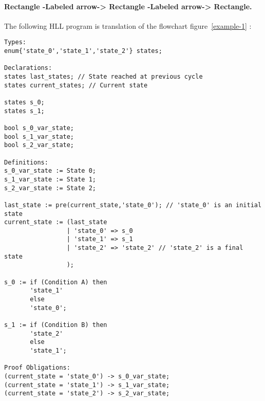 \paragraph{Rectangle -Labeled arrow-> Rectangle -Labeled arrow-> Rectangle.}
The following HLL program is translation of the flowchart
figure~\ref{example-1} : 
{\footnotesize
\begin{verbatim}
Types:
enum{'state_0','state_1','state_2'} states;

Declarations:
states last_states; // State reached at previous cycle
states current_states; // Current state

states s_0;
states s_1;

bool s_0_var_state;
bool s_1_var_state;
bool s_2_var_state;

Definitions:
s_0_var_state := State 0;
s_1_var_state := State 1;
s_2_var_state := State 2;

last_state := pre(current_state,'state_0'); // 'state_0' is an initial state
current_state := (last_state
                 | 'state_0' => s_0
                 | 'state_1' => s_1
                 | 'state_2' => 'state_2' // 'state_2' is a final state
                 );

s_0 := if (Condition A) then
       'state_1'
       else
       'state_0';

s_1 := if (Condition B) then
       'state_2'
       else
       'state_1';

Proof Obligations:
(current_state = 'state_0') -> s_0_var_state;
(current_state = 'state_1') -> s_1_var_state;
(current_state = 'state_2') -> s_2_var_state;
\end{verbatim}
}


